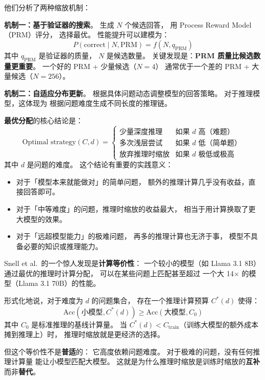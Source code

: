他们分析了两种缩放机制：

\textbf{机制一：基于验证器的搜索}。
生成 $N$ 个候选回答，
用 Process Reward Model（PRM）评分，
选择最优。
性能提升可以建模为：
\begin{equation}
  P(\text{correct} \mid N, \text{PRM}) = f(N, q_{\text{PRM}})
\end{equation}
其中 $q_{\text{PRM}}$ 是验证器的质量，
$N$ 是候选数量。
关键发现是：\textbf{PRM 质量比候选数量更重要}。
一个好的 PRM + 少量候选（$N = 4$）
通常优于一个差的 PRM + 大量候选（$N = 256$）。

\textbf{机制二：自适应分布更新}。
根据具体问题动态调整模型的回答策略。
对于推理模型，这体现为
根据问题难度生成不同长度的推理链。

\textbf{最优分配}的核心结论是：
\begin{equation}
  \text{Optimal strategy}(C, d) = \begin{cases}
    \text{少量深度推理} & \text{如果 } d \text{ 高（难题）} \\
    \text{多次浅层尝试} & \text{如果 } d \text{ 低（简单题）} \\
    \text{放弃推理时缩放} & \text{如果 } d \text{ 极低或极高}
  \end{cases}
\end{equation}
其中 $d$ 是问题的难度。
这个结论有重要的实践意义：
\begin{itemize}[noitemsep]
  \item 对于「模型本来就能做对」的简单问题，
        额外的推理计算几乎没有收益，直接回答即可。
  \item 对于「中等难度」的问题，推理时缩放的收益最大，
        相当于用计算换取了更大模型的效果。
  \item 对于「远超模型能力」的极难问题，
        再多的推理计算也无济于事，
        模型不具备必要的知识或推理能力。
\end{itemize}

\begin{whybox}[推理时缩放的数学等价性]
Snell et al.\ 的一个惊人发现是\textbf{计算等价性}：
一个较小的模型（如 Llama 3.1 8B）
通过最优的推理时计算分配，
可以在某些问题上匹配甚至超过
一个大 14$\times$ 的模型（Llama 3.1 70B）的性能。

形式化地说，对于难度为 $d$ 的问题集合，
存在一个推理计算预算 $C^*(d)$ 使得：
\begin{equation}
  \text{Acc}(\text{小模型}, C^*(d)) \geq \text{Acc}(\text{大模型}, C_0)
\end{equation}
其中 $C_0$ 是标准推理的基线计算量。
当 $C^*(d) < C_{\text{train}}$（训练大模型的额外成本摊到推理上）时，
推理时缩放就是更经济的选择。

但这个等价性不是\textbf{普适}的：
它高度依赖问题难度。
对于极难的问题，没有任何推理计算量
能让小模型匹配大模型。
这就是为什么推理时缩放是训练时缩放的\textbf{互补}而非\textbf{替代}。
\end{whybox}

